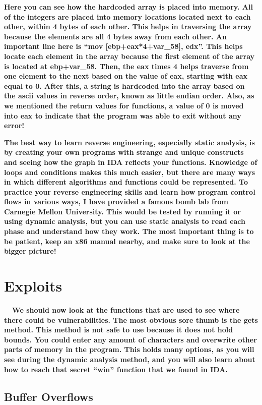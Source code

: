 \documentclass[letterpaper]{article}
\newcommand{\sitfig}[3]{
\begin{figure}[H]
\centering
\makebox[\textwidth][c]{
#2
}
\label{#1}
\end{figure}
}
\newcommand{\sitgfx}[4][scale=1.0]{
\sitfig{#3}{\texttt{[image: \#2]}}{#4}
}
\begin{document}
  
\sitgfx[width=6.5in,height=4.5311in]{reversing-img072.png}{fig:unk}{TODO CAPTION}
 

\textbf{Here you can see how the hardcoded array is placed into memory. All of the integers are placed into memory
locations located next to each other, within 4 bytes of each other. This helps in traversing the array because the
elements are all 4 bytes away from each other. An important line here is ``mov [ebp+eax*4+var\_58], edx''. This helps
locate each element in the array because the first element of the array is located at ebp+var\_58. Then, the eax times
4 helps traverse from one element to the next based on the value of eax, starting with eax equal to 0. After this, a
string is hardcoded into the array based on the ascii values in reverse order, known as little endian order. Also, as
we mentioned the return values for functions, a value of 0 is moved into eax to indicate that the program was able to
exit without any error!}

\textbf{The best way to learn reverse engineering, especially static analysis, is by creating your own programs with
strange and unique constructs and seeing how the graph in IDA reflects your functions. Knowledge of loops and
conditions makes this much easier, but there are many ways in which different algorithms and functions could be
represented. To practice your reverse engineering skills and learn how program control flows in various ways, I have
provided a famous bomb lab from Carnegie Mellon University. This would be tested by running it or using dynamic
analysis, but you can use static analysis to read each phase and understand how they work. The most important thing is
to be patient, keep an x86 manual nearby, and make sure to look at the bigger picture!}

\section{Exploits}

\textbf{ \ \ We should now look at the functions that are used to see where there could be vulnerabilities. The most
obvious sore thumb is the gets method. This method is not safe to use because it does not hold bounds. You could enter
any amount of characters and overwrite other parts of memory in the program. This holds many options, as you will see
during the dynamic analysis method, and you will also learn about how to reach that secret ``win'' function that we
found in IDA.}

\subsection{Buffer Overflows}
\end{document}
